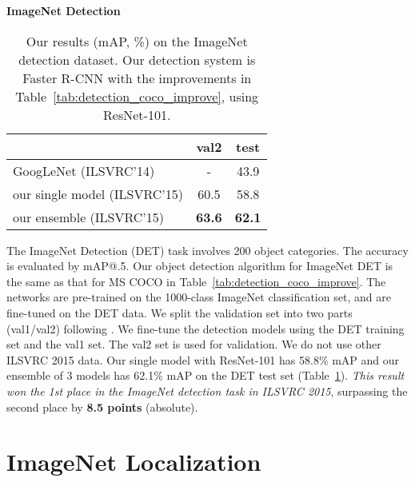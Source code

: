 \vspace{1em}
\noindent\textbf{ImageNet Detection}

\renewcommand\arraystretch{1.2}
\setlength{\tabcolsep}{10pt}
\begin{table}[t]
\begin{center}
\small
\begin{tabular}{l|c|c}
\hline
  & val2 & test \\
\hline
GoogLeNet \cite{Szegedy2015} (ILSVRC'14) & - & 43.9 \\
\hline
our single model (ILSVRC'15) & 60.5 & 58.8  \\
our ensemble (ILSVRC'15) & \textbf{63.6} & \textbf{62.1} \\
\hline
\end{tabular}
\end{center}
\vspace{-.5em}
\caption{Our results (mAP, \%) on the ImageNet detection dataset. Our detection system is Faster R-CNN \cite{Ren2015} with the improvements in Table~\ref{tab:detection_coco_improve}, using ResNet-101.
}
\vspace{-.5em}
\label{tab:imagenet_det}
\end{table}

The ImageNet Detection (DET) task involves 200 object categories. The accuracy is evaluated by mAP@.5.
Our object detection algorithm for ImageNet DET is the same as that for MS COCO in Table~\ref{tab:detection_coco_improve}. The networks are pre-trained on the 1000-class ImageNet classification set, and are fine-tuned on the DET data. We split the validation set into two parts (val1/val2) following \cite{Girshick2014}. We fine-tune the detection models using the DET training set and the val1 set. The val2 set is used for validation. We do not use other ILSVRC 2015 data. Our single model with ResNet-101 has 58.8\% mAP and our ensemble of 3 models has 62.1\% mAP on the DET test set (Table~\ref{tab:imagenet_det}). \emph{This result won the 1st place in the ImageNet detection task in ILSVRC 2015}, surpassing the second place by \textbf{8.5 points} (absolute).

%

\section{ImageNet Localization}
\label{sec:appendix_localization}

